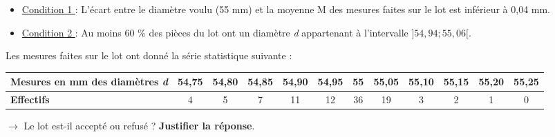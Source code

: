 \documentclass[a4paper,11pt]{article}
\newcommand{\bi}{\begin{itemize}}
\newcommand{\ei}{\end{itemize}}
\newcommand{\reponse}[1][1]{%
\multido{}{#1}{\makebox[\linewidth]{\rule[0pt]{0pt}{20pt}\dotfill}
}}
\begin{document}
\bi
\item \underline{Condition 1 }: L'écart entre le diamètre voulu (55 mm) et la moyenne  M  des mesures faites sur le lot est inférieur à 0,04 mm.\\

\item \underline{Condition 2 }: Au moins 60 $\%$ des pièces du lot ont un diamètre \textit{d} appartenant à l'intervalle $]54,94 ; 55,06[$.\\

\ei

Les mesures faites sur le lot ont donné la série statistique suivante :\\

\begin{tabular}{|m{3cm}|c|c|c|c|c|c|c|c|c|c|c|}
\hline 
\textbf{Mesures en mm des diamètres \textit{d} }& 54,75 & 54,80 & 54,85 & 54,90 & 54,95 & 55 & 55,05 & 55,10 & 55,15 & 55,20 & 55,25 \\ 
\hline 
\textbf{Effectifs} & 4 & 5 & 7 & 11 & 12 & 36 & 19 & 3 & 2 & 1 & 0  \\ 
\hline 
\end{tabular} 

\vspace*{0.3cm}

$\rightarrow$ Le lot est-il accepté ou refusé ? \textbf{Justifier la réponse}.\\
\reponse[8]\\
\end{document}
